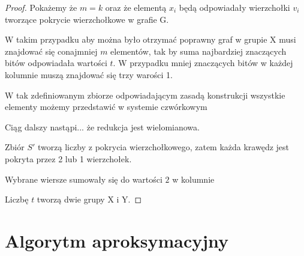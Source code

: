 \begin{proof}
Pokażemy że $m = k$ oraz że elementą $x_i$ będą odpowiadały wierzchołki $v_i$ tworzące pokrycie wierzchołkowe w grafie G.


W takim przypadku aby można było otrzymać poprawny graf w grupie X musi znajdować się conajmniej $m$ elementów, tak by suma najbardziej znaczących bitów odpowiadała wartości $t$. W przypadku mniej znaczących bitów w każdej kolumnie muszą znajdować się trzy warości 1. 


W tak zdefiniowanym zbiorze odpowiadającym zasadą konstrukcji wszystkie elementy możemy przedstawić w systemie czwórkowym


Ciąg dalszy nastąpi... że redukcja jest wielomianowa.


Zbiór $S'$ tworzą liczby z pokrycia wierzchołkowego, zatem każda krawędz jest pokryta przez 2 lub 1 wierzchołek. 

Wybrane wiersze sumowały się do wartości $2$ w kolumnie 



 Liczbę $t$ tworzą dwie grupy X i Y.
\end{proof}

\section{Algorytm aproksymacyjny}